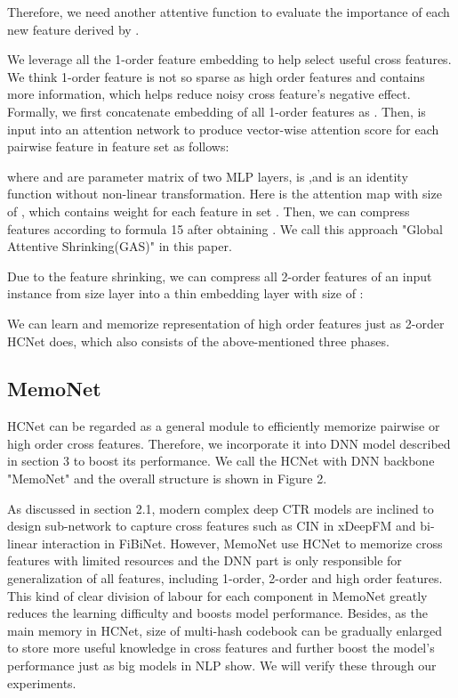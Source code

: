 \documentclass[sigconf,authorversion]{acmart}
\begin{document}
Therefore, we need another attentive function  to evaluate the importance of each new feature derived by . 

We leverage all the 1-order feature embedding to help select useful cross features. We think 1-order feature is not so sparse as high order features and contains more information, which helps reduce noisy cross feature's negative effect. Formally, we first concatenate embedding of all 1-order features as . Then,  is input into an attention network to produce vector-wise attention score for each pairwise feature  in feature set  as follows:

 where   and  are 
parameter matrix of two MLP layers,  is  ,and  is an identity function without non-linear transformation. Here   is the attention map with size of  , which contains weight for each feature in  set . Then, we can compress features according to formula 15 after obtaining . We call this approach "Global Attentive Shrinking(GAS)" in this paper.

Due to the feature shrinking, we can compress all 2-order features of an input instance from  size layer into a thin embedding layer  with size of  :


 
We can learn and memorize representation of high order features just as 2-order HCNet does, which also consists of the above-mentioned three phases. 


\subsection{MemoNet}
HCNet can be regarded as a general module to efficiently memorize pairwise or high order cross features. Therefore, we incorporate it into DNN model described in section 3 to boost its performance. We call the HCNet with DNN backbone "MemoNet" and the overall structure is shown in Figure 2.

As discussed in section 2.1, modern complex deep CTR models are inclined to design sub-network to capture cross features such as CIN in xDeepFM\cite{lian2018xdeepfm} and bi-linear interaction in FiBiNet\cite{HuangZZ19}. However, MemoNet use HCNet to memorize cross features with limited resources and the DNN part is only responsible for generalization of all features, including 1-order, 2-order and high order features. This kind of clear division of labour for each component in MemoNet greatly reduces the learning difficulty and boosts model performance. Besides, as the main memory in HCNet, size of multi-hash codebook can be gradually enlarged to store more useful knowledge in cross features and further boost the model's performance just as big models in NLP show. We will verify these through our experiments.
\end{document}
